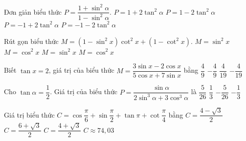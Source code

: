 \begin{ex}%
	Đơn giản biểu thức $P=\dfrac{1+\sin ^2\alpha}{1-\sin ^2\alpha}$. 
	\choice 
		{\True $P=1+2\tan  ^2\alpha$}
		{$P=1-2\tan ^2\alpha$} 
		{$P=-1+2\tan ^2\alpha$} 
		 {$P=-1-2\tan ^2\alpha$}
\end{ex}

\begin{ex}%
	Rút gọn biểu thức $M=\left(1-\sin ^2x\right)\cot ^2x+\left(1-\cot ^2x\right)$. 
	\choice 
		{\True $M=\sin ^2x$} 
		{$M=\cos  ^2x$}
		{$M=\sin  ^2x$}
		 {$M=\cos ^2x$}
\end{ex}

\begin{ex}%
	 Biết $\tan x=2$, giá trị của biểu thức $M=\dfrac{3\sin x-2\cos x}{5\cos x+7\sin x}$ bằng
	 \choice
		{$\dfrac{4}{9}$} 
		{$-\dfrac{4}{9}$} 
		{\True $\dfrac{4}{19}$} 
		{$-\dfrac{4}{19}$} 
\end{ex}

\begin{ex}%
	Cho  $\tan \alpha=\dfrac{1}{2}$. Giá trị của biểu thức $P=\dfrac{\sin \alpha}{2\sin ^3\alpha+3\cos ^3\alpha}$ là
	 \choice
		{\True $\dfrac{5}{26}$} 
		 {$\dfrac{1}{3}$}
		{$-\dfrac{5}{26}$} 
		{$-\dfrac{1}{3}$} 
	\loigiai{ 
		\[P=\dfrac{\sin \alpha}{2\sin ^3\alpha+3\cos  ^3\alpha}=\dfrac{\sin \alpha \left(\sin ^2\alpha+\cos^2\alpha \right)}{2\sin ^3\alpha+3\cos ^3\alpha}=\dfrac{\tan ^3\alpha+\tan \alpha}{2\tan ^3\alpha+3}=\dfrac{5}{26}.\]
	} 
\end{ex}

\begin{ex}%
	Giá trị biểu thức $C=\cos \dfrac{\pi }{6}+\sin \dfrac{\pi }{2}+\tan \pi +\cot \dfrac{\pi  }{4}$ bằng
	\choice 
		{$C=\dfrac{4-\sqrt{3}}{2}$} 
		{$C=\dfrac{6+\sqrt{3}}{2}$} 
		{\True $C=\dfrac{4+\sqrt{3}}{2}$} 
		 {$C\approx 74{,}03$}
\end{ex}

